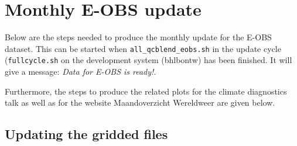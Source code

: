 \documentclass[a4paper]{article}
\begin{document}


\section{Monthly E-OBS update}

Below are the steps needed to produce the monthly update for the E-OBS
dataset. This can be started when \texttt{all\_qcblend\_eobs.sh} in
the update cycle (\texttt{fullcycle.sh} on the development system
(bhlbontw) has been finished. It will give a message: \textit{Data for
  E-OBS is ready!}.

Furthermore, the steps to produce the related plots for the climate
diagnostics talk as well as for the website Maandoverzicht Wereldweer
are given below.


\subsection{Updating the gridded files}
\end{document}
